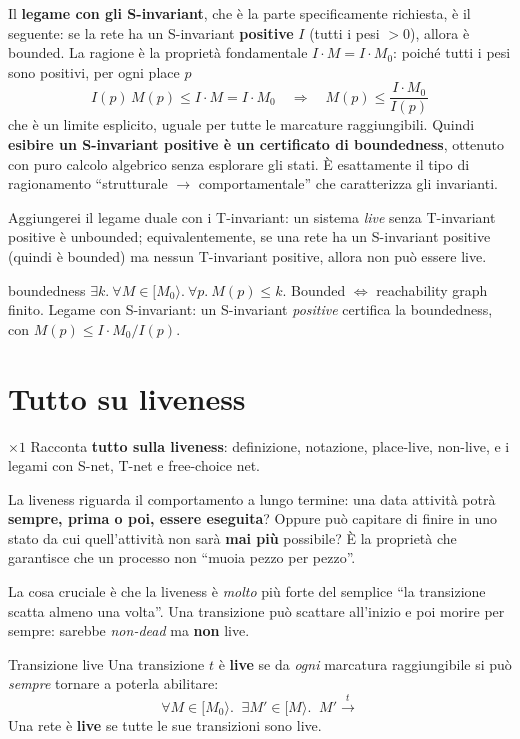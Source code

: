 Il \textbf{legame con gli S-invariant}, che è la parte specificamente richiesta, è il seguente: se la rete ha un S-invariant \textbf{positive} $I$ (tutti i pesi $>0$), allora è bounded. La ragione è la proprietà fondamentale $I\cdot M = I\cdot M_0$: poiché tutti i pesi sono positivi, per ogni place $p$
$$I(p)\,M(p) \le I\cdot M = I\cdot M_0 \quad\Longrightarrow\quad M(p) \le \frac{I\cdot M_0}{I(p)}$$
che è un limite esplicito, uguale per tutte le marcature raggiungibili. Quindi \textbf{esibire un S-invariant positive è un certificato di boundedness}, ottenuto con puro calcolo algebrico senza esplorare gli stati. È esattamente il tipo di ragionamento ``strutturale $\to$ comportamentale'' che caratterizza gli invarianti.

Aggiungerei il legame duale con i T-invariant: un sistema \emph{live} senza T-invariant positive è unbounded; equivalentemente, se una rete ha un S-invariant positive (quindi è bounded) ma nessun T-invariant positive, allora non può essere live.

\begin{puntochiave}{boundedness}
$\exists k.\ \forall M\in[M_0\rangle.\ \forall p.\ M(p)\le k$. Bounded $\iff$ reachability graph finito. Legame con S-invariant: un S-invariant \emph{positive} certifica la boundedness, con $M(p)\le I\cdot M_0/I(p)$.
\end{puntochiave}

\section{Tutto su liveness}

\begin{domanda}{$\times 1$}
Racconta \textbf{tutto sulla liveness}: definizione, notazione, place-live, non-live, e i legami con S-net, T-net e free-choice net.
\end{domanda}

La liveness riguarda il comportamento a lungo termine: una data attività potrà \textbf{sempre, prima o poi, essere eseguita}? Oppure può capitare di finire in uno stato da cui quell'attività non sarà \textbf{mai più} possibile? È la proprietà che garantisce che un processo non ``muoia pezzo per pezzo''.

La cosa cruciale è che la liveness è \emph{molto} più forte del semplice ``la transizione scatta almeno una volta''. Una transizione può scattare all'inizio e poi morire per sempre: sarebbe \emph{non-dead} ma \textbf{non} live.

\begin{definizione}{Transizione live}
Una transizione $t$ è \textbf{live} se da \emph{ogni} marcatura raggiungibile si può \emph{sempre} tornare a poterla abilitare:
$$\forall M \in [M_0\rangle.\;\; \exists M' \in [M\rangle.\;\; M' \xrightarrow{t}$$
Una rete è \textbf{live} se tutte le sue transizioni sono live.
\end{definizione}

